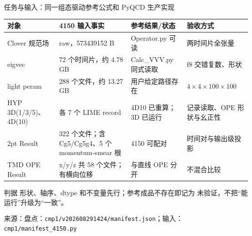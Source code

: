 \documentclass[UTF8,aspectratio=169,11pt]{ctexbeamer}
\newcommand{\source}[1]{\vspace{0.05em}\par{\raggedright\scriptsize\color{muted}来源：#1\par}}
\newcommand{\codepath}[1]{\nolinkurl{#1}}
\newcommand{\unverified}{\textcolor{warning}{未验证}}
\begin{document}
\begin{frame}[t]{任务与输入：同一组态驱动参考公式和 PyQCD 生产实现}
  \footnotesize
  \setlength{\tabcolsep}{3pt}
  \renewcommand{\arraystretch}{0.98}
  \begin{tabularx}{0.96\textwidth}{@{}L Y M Y@{}}
    \toprule
    对象 & 4150 输入事实 & 参考结果/状态 & 验收方式\\
    \midrule
    Clover 规范场 & raw，573439152 B & Operator.py 可读 & 两时间片全张量\\
    eigvec & 72 个时间片，约 4.78 GB & Calc\_VVV.py 同式读取 & f8 交错复数、形状\\
    light peram & 288 个文件，约 13.27 GB & 用户给定路径存在 & $4\times4\times100\times100$\\
    HYP 3D(1/3/5)、4D(10) & 各 7 个 LIME record & 4D10 已重算；3D 已运行 & 记录读取、OPE 形状与幺正性\\
    2pt Result & 322 个文件；含 Cg5/Cg5g4、5 个 momentum-smear 根 & 4150 可配对 & 时间对与输出级投影\\
    TMD OPE Result & x/y/z 共 58 个文件；有横向位移 & 与直线 OPE 分开 & 不混合比较\\
    \bottomrule
  \end{tabularx}
  \vspace{0.12em}
  \begin{block}{判据}
    形状、轴序、dtype 和不变量先行；参考成品不存在即记为 \unverified，不把“能运行”升级为“一致”。
  \end{block}
  \source{盘点：\codepath{cmp1/v202608291424/manifest.json}；输入：\codepath{cmp1/manifest_4150.py}}
\end{frame}
\end{document}
